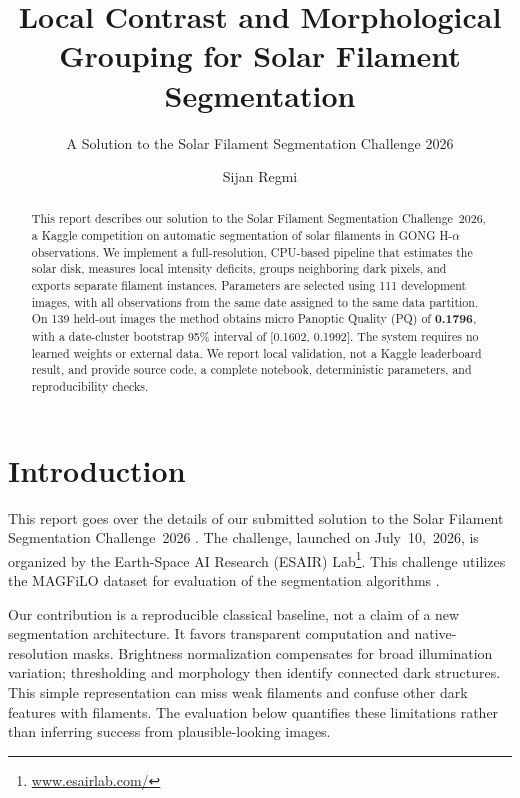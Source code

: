 \documentclass[sigconf]{acmart}
\begin{document}
\title{Local Contrast and Morphological Grouping for Solar Filament Segmentation}
\subtitle{A Solution to the Solar Filament Segmentation Challenge 2026}
\author{Sijan Regmi}
\begin{abstract}
This report describes our solution to the Solar Filament Segmentation Challenge~2026, a Kaggle competition on automatic segmentation of solar filaments in GONG H-$\alpha$ observations. We implement a full-resolution, CPU-based pipeline that estimates the solar disk, measures local intensity deficits, groups neighboring dark pixels, and exports separate filament instances. Parameters are selected using 111 development images, with all observations from the same date assigned to the same data partition. On 139 held-out images the method obtains micro Panoptic Quality (PQ) of \textbf{0.1796}, with a date-cluster bootstrap 95\% interval of [0.1602, 0.1992]. The system requires no learned weights or external data. We report local validation, not a Kaggle leaderboard result, and provide source code, a complete notebook, deterministic parameters, and reproducibility checks.
\end{abstract}
\maketitle
\section{Introduction}
This report goes over the details of our submitted solution to the Solar Filament Segmentation Challenge~2026 \cite{filament-segmentation-2026}. The challenge, launched on July~10,~2026, is organized by the Earth-Space AI Research (ESAIR) Lab\footnote{\href{https://www.esairlab.com/home}{www.esairlab.com/}}. This challenge utilizes the MAGFiLO dataset for evaluation of the segmentation algorithms \cite{ahmadzadeh2024dataset}.

Our contribution is a reproducible classical baseline, not a claim of a new segmentation architecture. It favors transparent computation and native-resolution masks. Brightness normalization compensates for broad illumination variation; thresholding and morphology then identify connected dark structures. This simple representation can miss weak filaments and confuse other dark features with filaments. The evaluation below quantifies these limitations rather than inferring success from plausible-looking images.
\end{document}
